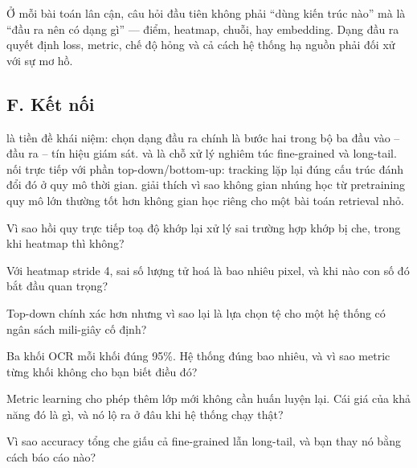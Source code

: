 \documentclass[../../../deep_learning.tex]{subfiles}
\begin{document}
\begin{cannho}
Ở mỗi bài toán lân cận, câu hỏi đầu tiên không phải ``dùng kiến trúc nào'' mà là ``đầu ra nên có dạng gì'' --- điểm, heatmap, chuỗi, hay embedding. Dạng đầu ra quyết định loss, metric, chế độ hỏng và cả cách hệ thống hạ nguồn phải đối xử với sự mơ hồ. 
\end{cannho}

\subsection{F. Kết nối}
 là tiền đề khái niệm: chọn dạng đầu ra chính là bước hai trong bộ ba đầu vào -- đầu ra -- tín hiệu giám sát.  và  là chỗ xử lý nghiêm túc fine-grained và long-tail.  nối trực tiếp với phần top-down/bottom-up: tracking lặp lại đúng cấu trúc đánh đổi đó ở quy mô thời gian.  giải thích vì sao không gian nhúng học từ pretraining quy mô lớn thường tốt hơn không gian học riêng cho một bài toán retrieval nhỏ.

\begin{tukiem}
\item Vì sao hồi quy trực tiếp toạ độ khớp lại xử lý sai trường hợp khớp bị che, trong khi heatmap thì không?
\item Với heatmap stride 4, sai số lượng tử hoá là bao nhiêu pixel, và khi nào con số đó bắt đầu quan trọng?
\item Top-down chính xác hơn nhưng vì sao lại là lựa chọn tệ cho một hệ thống có ngân sách mili-giây cố định?
\item Ba khối OCR mỗi khối đúng 95\%. Hệ thống đúng bao nhiêu, và vì sao metric từng khối không cho bạn biết điều đó?
\item Metric learning cho phép thêm lớp mới không cần huấn luyện lại. Cái giá của khả năng đó là gì, và nó lộ ra ở đâu khi hệ thống chạy thật?
\item Vì sao accuracy tổng che giấu cả fine-grained lẫn long-tail, và bạn thay nó bằng cách báo cáo nào?
\end{tukiem}
\ifSubfilesClassLoaded{\printbibliography[title={Nguồn}]}{}
\end{document}
